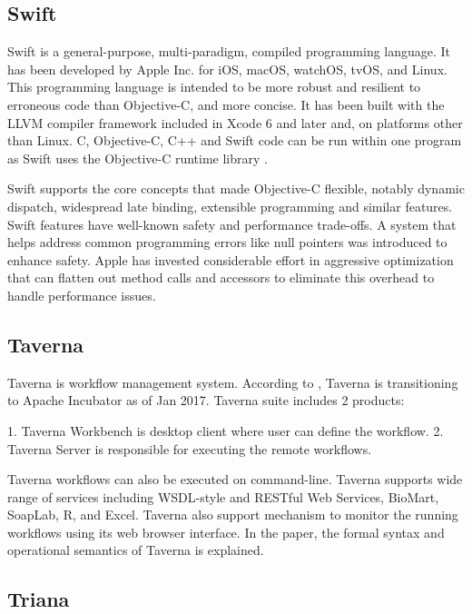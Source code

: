 \subsection{Swift}

   Swift is a general-purpose, multi-paradigm, compiled programming
   language. It has been developed by Apple Inc. for iOS, macOS,
   watchOS, tvOS, and Linux. This programming language is intended to
   be more robust and resilient to erroneous code than Objective-C,
   and more concise. It has been built with the LLVM compiler
   framework included in Xcode 6 and later and, on platforms other
   than Linux. C, Objective-C, C++ and Swift code can be run within
   one program as Swift uses the Objective-C runtime
   library \cite{www-swift-wikipedia}.

   Swift supports the core concepts that made Objective-C flexible,
   notably dynamic dispatch, widespread late binding, extensible
   programming and similar features. Swift features have well-known
   safety and performance trade-offs. A system that helps address
   common programming errors like null pointers was introduced to
   enhance safety. Apple has invested considerable effort in
   aggressive optimization that can flatten out method calls and
   accessors to eliminate this overhead to handle performance issues.
      
\subsection{Taverna}

   Taverna is workflow management system. According to
   \cite{www-taverna}, Taverna is transitioning to Apache Incubator
   as of Jan 2017.  Taverna suite includes 2 products:

   1. Taverna Workbench is desktop client where user can define the
      workflow.
   2. Taverna Server is responsible for executing the remote
      workflows.

   Taverna workflows can also be executed on command-line.  Taverna
   supports wide range of services including WSDL-style and RESTful
   Web Services, BioMart, SoapLab, R, and Excel. Taverna also support
   mechanism to monitor the running workflows using its web browser
   interface.  In the \cite{taverna-paper} paper, the formal syntax
   and operational semantics of Taverna is explained.

\subsection{Triana}

